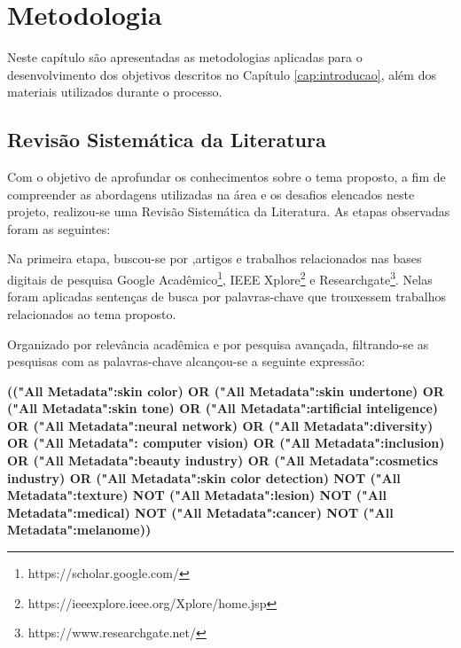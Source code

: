 \chapter{Metodologia}
\label{cap:metodologia}
Neste capítulo são apresentadas as metodologias aplicadas para o desenvolvimento dos objetivos descritos no Capítulo \ref{cap:introducao}, além dos materiais utilizados durante o processo.

\section{Revisão Sistemática da Literatura}
Com o objetivo de aprofundar os conhecimentos sobre o tema proposto, a fim de compreender as abordagens utilizadas na área e os desafios elencados neste projeto, realizou-se uma Revisão Sistemática da Literatura. As etapas observadas foram as seguintes:

 
Na primeira etapa, buscou-se por ,artigos e trabalhos relacionados nas bases digitais de pesquisa Google Acadêmico\footnote{https://scholar.google.com/}, IEEE Xplore\footnote{https://ieeexplore.ieee.org/Xplore/home.jsp} e Researchgate\footnote{https://www.researchgate.net/}. Nelas foram aplicadas sentenças de busca por palavras-chave que trouxessem trabalhos relacionados ao tema proposto. 

Organizado por relevância acadêmica e por pesquisa avançada, filtrando-se as pesquisas com as palavras-chave alcançou-se a seguinte expressão:

\begin{center}
\centering
\textbf{(("All Metadata":skin color) OR ("All Metadata":skin undertone) OR ("All Metadata":skin tone) OR ("All Metadata":artificial inteligence) OR ("All Metadata":neural network) OR ("All Metadata":diversity) OR ("All Metadata": computer vision) OR ("All Metadata":inclusion) OR ("All Metadata":beauty industry) OR ("All Metadata":cosmetics industry) OR ("All Metadata":skin color detection) NOT ("All Metadata":texture) NOT ("All Metadata":lesion) NOT ("All Metadata":medical) NOT ("All Metadata":cancer) NOT ("All Metadata":melanome))}
\end{center}

